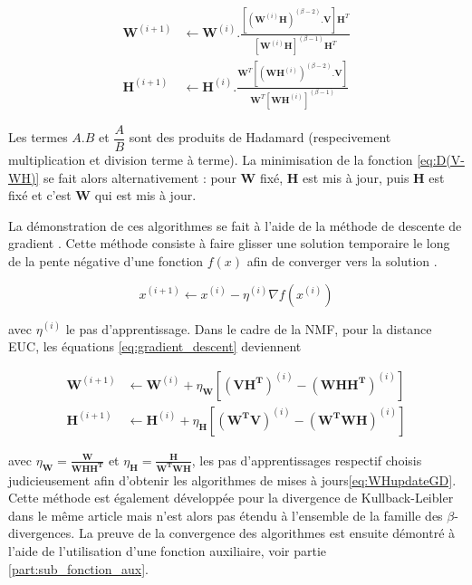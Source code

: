 \begin{subequations}\label{eq:WHupdateGD}
\begin{align}
\textbf{W}^{(i+1)} &\leftarrow \textbf{W}^{(i)}.\frac{\left[\left(\textbf{W}^{(i)}\mathbf{H} \right)^{(\beta-2)}.\textbf{V} \right]\textbf{H}^T}{\left[\textbf{W}^{(i)}\mathbf{H} \right]^{(\beta-1)}\textbf{H}^T}\\
\textbf{H}^{(i+1)} &\leftarrow \textbf{H}^{(i)}.\frac{\textbf{W}^T \left[\left(\textbf{WH}^{(i)} \right)^{(\beta-2)}.\textbf{V} \right]}{\textbf{W}^T \left[\textbf{WH}^{(i)} \right]^{(\beta-1)}}
\end{align}
\end{subequations}

Les termes $A.B$ et $\dfrac{A}{B}$ sont des produits de Hadamard (respecivement multiplication et division terme à terme). La minimisation de la fonction \ref{eq:D(V-WH)} se fait alors alternativement : pour $\mathbf{W}$ fixé, $\mathbf{H}$ est mis à jour, puis $\mathbf{H}$ est fixé et c'est $\mathbf{W}$ qui est mis à jour.

La démonstration de ces algorithmes se fait à l'aide de la méthode de descente de gradient \cite{lee_algorithms_2000}. Cette méthode consiste à faire \og glisser \fg {} une solution temporaire le long de la pente négative d'une fonction $f(x)$ afin de converger vers la solution \cite{kivinen_exponentiated_1994}.

\begin{equation}\label{eq:gradient_descent}
x^{(i+1)} \leftarrow x^{(i)} - \eta^{(i)} \nabla f(x^{(i)})
\end{equation} 

avec $\eta^{(i)}$ le pas d'apprentissage. Dans le cadre de la NMF, pour la distance EUC, les équations \ref{eq:gradient_descent} deviennent

\begin{subequations}\label{eq:WHgradientDescente}
    \begin{align}
     \mathbf{W}^{(i+1)} & \leftarrow \mathbf{W}^{(i)}+\eta_{\mathbf{W}}\left[ \left(\mathbf{V H^T}\right)^{(i)} - \left(\mathbf{W H H^T}\right)^{(i)} \right ] \\
      \mathbf{H}^{(i+1)} & \leftarrow \mathbf{H}^{(i)}+\eta_{\mathbf{H}}\left[ \left(\mathbf{W^TV}\right)^{(i)}-\left(\mathbf{W^T W H} \right)^{(i)}\right ]      
    \end{align}
\end{subequations}

avec $\eta_{\mathbf{W}} = \frac{\mathbf{W}}{\mathbf{WHH^T}}$ et $\eta_{\mathbf{H}} = \frac{\mathbf{H}}{\mathbf{W^TWH}}$, les pas d'apprentissages respectif choisis judicieusement afin d'obtenir les algorithmes de mises à jours\ref{eq:WHupdateGD}. Cette méthode est également développée pour la divergence de Kullback-Leibler dans le même article mais n'est alors pas étendu à l'ensemble de la famille des $\beta$-divergences. La preuve de la convergence des algorithmes est ensuite démontré à l'aide de l'utilisation d'une fonction auxiliaire, voir partie \ref{part:sub_fonction_aux}.



